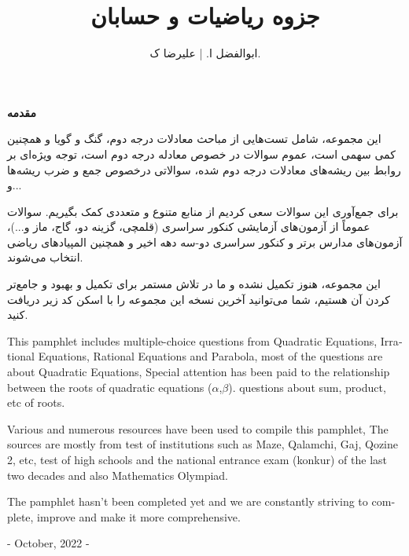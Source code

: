 \documentclass[11pt]{book}
\title{ جزوه ریاضیات و حسابان}
\author{ابوالفضل ا. | علیرضا ک.}
\begin{document}
\maketitle

\thispagestyle{empty}

\bigskip



\begin{center}
	\begin{minipage}{17cm}
{\large 
	\setlength{\parindent}{1.5em}
	
	\textbf{{\huge مقدمه }}\bigskip
	
	\indent
این مجموعه، شامل تست‌هایی از مباحث معادلات درجه دوم، گنگ و گویا و همچنین کمی سهمی است، عموم سوالات در خصوص معادله درجه دوم است، توجه ویژه‌ای بر روابط بین ریشه‌های معادلات درجه دوم شده، سوالاتی درخصوص جمع و ضرب ریشه‌ها و...
\smallskip

برای جمع‌آوری این سوالات سعی کردیم از منابع متنوع و متعددی کمک بگیریم. سوالات عموماً از آزمون‌های آزمایشی کنکور سراسری (قلمچی، گزینه دو، گاج، ماز و...)، آزمون‌های مدارس برتر و کنکور سراسری دو-سه دهه اخیر و همچنین المپیادهای ریاضی انتخاب می‌شوند.\smallskip

این مجموعه، هنوز تکمیل نشده و ما در تلاش مستمر برای تکمیل و بهبود و جامع‌تر کردن‌ آن هستیم، شما می‌توانید آخرین نسخه این مجموعه را با اسکن کد زیر دریافت کنید.

\bigskip

\begin{latin}   


This pamphlet includes multiple-choice questions from Quadratic Equations, Irrational Equations, Rational Equations and Parabola, most of the questions are about Quadratic Equations, Special attention has been paid to the relationship between the roots of quadratic equations ($\alpha$,$\beta$). questions about sum, product, etc of roots.



Various and numerous resources have been used to compile this pamphlet, The sources are mostly from test of institutions such as Maze, Qalamchi, Gaj, Qozine 2, etc, test of high schools and the national entrance exam (konkur) of the last two decades and also Mathematics Olympiad.%

The pamphlet hasn't been completed yet and we are constantly striving to complete, improve and make it more comprehensive.

\hfill - October, 2022 - 
\end{latin}

}\end{minipage}
\end{center}
\end{document}

